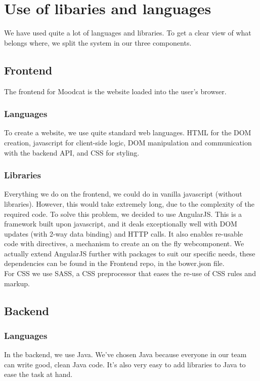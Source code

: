 \section{Use of libaries and languages}
We have used quite a lot of languages and libraries.
To get a clear view of what belongs where, we split the system in our three components.

\subsection{Frontend}
The frontend for Moodcat is the website loaded into the user's browser.

\subsubsection{Languages}
To create a website, we use quite standard web languages.
HTML for the DOM creation, javascript for client-side logic, DOM manipulation and communication with the backend API, and CSS for styling.

\subsubsection{Libraries}
Everything we do on the frontend, we could do in vanilla javascript (without libraries).
However, this would take extremely long, due to the complexity of the required code.
To solve this problem, we decided to use AngularJS.
This is a framework built upon javascript, and it deals exceptionally well with DOM updates (with 2-way data binding) and HTTP calls.
It also enables re-usable code with directives, a mechanism to create an on the fly webcomponent.
We actually extend AngularJS further with packages to suit our specific needs, these dependencies can be found in the Frontend repo, in the bower.json file.\\

For CSS we use SASS, a CSS preprocessor that eases the re-use of CSS rules and markup.

\subsection{Backend}

\subsubsection{Languages}
In the backend, we use Java.
We've chosen Java because everyone in our team can write good, clean Java code.
It's also very easy to add libraries to Java to ease the task at hand. 

